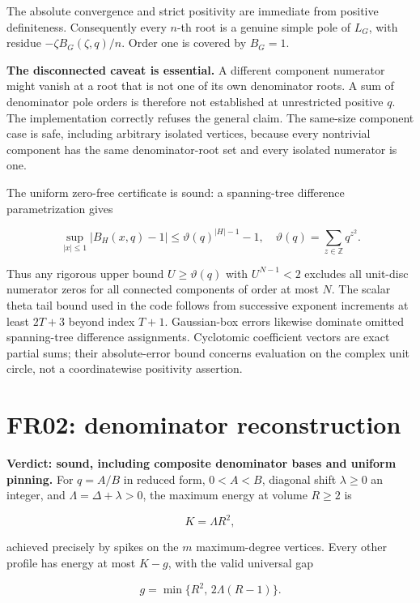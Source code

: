 \documentclass[
  11pt,
  a4paper,
]{report}
\begin{document}
The absolute convergence and strict positivity are immediate from
positive definiteness. Consequently every \(n\)-th root is a genuine
simple pole of \(L_G\), with residue \(-\zeta B_G(\zeta,q)/n\). Order
one is covered by \(B_G=1\).

\textbf{The disconnected caveat is essential.} A different component
numerator might vanish at a root that is not one of its own denominator
roots. A sum of denominator pole orders is therefore not established at
unrestricted positive \(q\). The implementation correctly refuses the
general claim. The same-size component case is safe, including arbitrary
isolated vertices, because every nontrivial component has the same
denominator-root set and every isolated numerator is one.

The uniform zero-free certificate is sound: a spanning-tree difference
parametrization gives

\[
 \sup_{|x|\le1}|B_H(x,q)-1|
 \le \vartheta(q)^{|H|-1}-1,
 \quad \vartheta(q)=\sum_{z\in\mathbb Z}q^{z^2}.
\]

Thus any rigorous upper bound \(U\ge\vartheta(q)\) with \(U^{N-1}<2\)
excludes all unit-disc numerator zeros for all connected components of
order at most \(N\). The scalar theta tail bound used in the code
follows from successive exponent increments at least \(2T+3\) beyond
index \(T+1\). Gaussian-box errors likewise dominate omitted
spanning-tree difference assignments. Cyclotomic coefficient vectors are
exact partial sums; their absolute-error bound concerns evaluation on
the complex unit circle, not a coordinatewise positivity assertion.

\hypertarget{fr02-denominator-reconstruction}{%
\section{FR02: denominator
reconstruction}\label{fr02-denominator-reconstruction}}

\textbf{Verdict: sound, including composite denominator bases and
uniform pinning.} For \(q=A/B\) in reduced form, \(0<A<B\), diagonal
shift \(\lambda\ge0\) an integer, and \(\Lambda=\Delta+\lambda>0\), the
maximum energy at volume \(R\ge2\) is

\[
 K=\Lambda R^2,
\]

achieved precisely by spikes on the \(m\) maximum-degree vertices. Every
other profile has energy at most \(K-g\), with the valid universal gap

\[
 g=\min\{R^2,\,2\Lambda(R-1)\}.
\]
\end{document}
